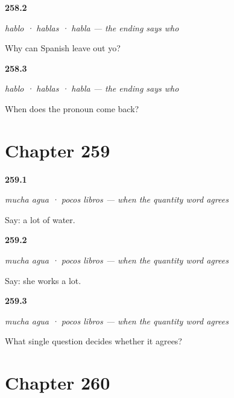 \noindent\begin{minipage}[t]{\linewidth}
\raggedright
\hypertarget{review-ES-C66-la-terminacion-dice-quien-drop}{\textbf{258.2}} \emph{hablo · hablas · habla — the ending says who}\par
\small Why can Spanish leave out yo?
\end{minipage}\par\medskip

\noindent\begin{minipage}[t]{\linewidth}
\raggedright
\hypertarget{review-ES-C66-la-terminacion-dice-quien-back}{\textbf{258.3}} \emph{hablo · hablas · habla — the ending says who}\par
\small When does the pronoun come back?
\end{minipage}\par\medskip

\section*{Chapter 259}

\noindent\begin{minipage}[t]{\linewidth}
\raggedright
\hypertarget{review-ES-C66-mucha-agua-noun}{\textbf{259.1}} \emph{mucha agua · pocos libros — when the quantity word agrees}\par
\small Say: a lot of water.
\end{minipage}\par\medskip

\noindent\begin{minipage}[t]{\linewidth}
\raggedright
\hypertarget{review-ES-C66-mucha-agua-verb}{\textbf{259.2}} \emph{mucha agua · pocos libros — when the quantity word agrees}\par
\small Say: she works a lot.
\end{minipage}\par\medskip

\noindent\begin{minipage}[t]{\linewidth}
\raggedright
\hypertarget{review-ES-C66-mucha-agua-test}{\textbf{259.3}} \emph{mucha agua · pocos libros — when the quantity word agrees}\par
\small What single question decides whether it agrees?
\end{minipage}\par\medskip

\section*{Chapter 260}

